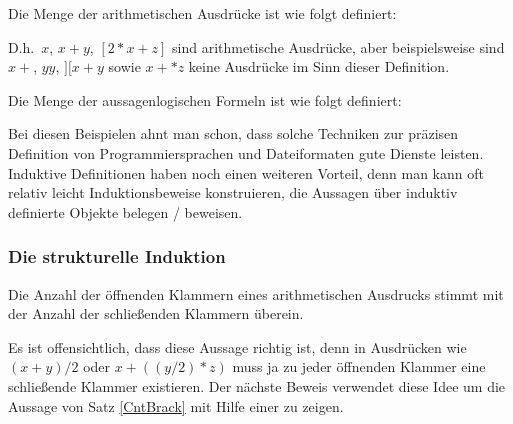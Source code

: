 \begin{example}
\label{induexp}
\noindent Die Menge der arithmetischen Ausdrücke ist wie folgt definiert:

\medskip


\medskip

\noindent D.h.~$x$, $x+y$, $[2*x + z]$ sind arithmetische Ausdrücke,
aber beispielsweise sind $x + $, $yy$, $][x+y$ sowie $x +* z$ keine
Ausdrücke im Sinn dieser Definition.
\end{example}

\begin{example}
\label{indubool}
\noindent Die Menge der aussagenlogischen Formeln ist wie folgt definiert:

\medskip

\end{example}

Bei diesen Beispielen ahnt man schon, dass solche Techniken zur
präzisen Definition von Programmiersprachen und Dateiformaten gute
Dienste leisten. Induktive Definitionen haben noch einen weiteren
Vorteil, denn man kann oft relativ leicht Induktionsbeweise konstruieren, die 
Aussagen über induktiv definierte Objekte belegen / beweisen.

\subsubsection{Die strukturelle Induktion}

\begin{theorem}
\label{CntBrack}
Die Anzahl der öffnenden Klammern eines arithmetischen Ausdrucks stimmt
mit der Anzahl der schließenden Klammern überein.
\end{theorem}

Es ist offensichtlich, dass diese Aussage richtig ist, denn in
Ausdrücken wie $(x + y) / 2$ oder $x + ((y/2) * z)$ muss ja zu jeder
öffnenden Klammer eine schließende Klammer existieren. Der nächste
Beweis verwendet diese Idee um die Aussage von Satz \ref{CntBrack}
mit Hilfe einer 
zu zeigen.

